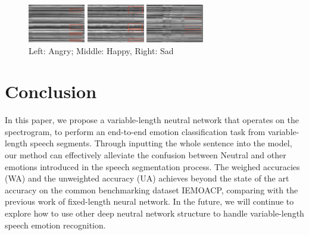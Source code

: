 \documentclass[a4paper]{article}
\begin{document}
\begin{figure}[htb]
    \begin{minipage}[b]{0.25\linewidth}
      \centering
      \centerline{\includegraphics[width=2.5cm]{rnn_out_var_ang}}
    \end{minipage}
    \hfill
    \begin{minipage}[b]{0.25\linewidth}
      \centering
      \centerline{\includegraphics[width=2.5cm]{rnn_out_var_hap}}
    \end{minipage}
    \hfill
    \begin{minipage}[b]{0.25\linewidth}
      \centering
      \centerline{\includegraphics[width=2.5cm]{rnn_out_var_sad}}
    \end{minipage}
    \caption{Left: Angry; Middle: Happy, Right: Sad}
    \label{fig:rnn_emo}
\end{figure}


    
\section{Conclusion}
\label{sec:conclusion}

In this paper, we propose a variable-length neutral network that operates on the spectrogram, to perform an end-to-end emotion classification task from variable-length speech segments. Through inputting the whole sentence into the model, our method can effectively alleviate the confusion between Neutral and other emotions introduced in the speech segmentation process. The weighed accuracies (WA) and the unweighted accuracy (UA) achieves beyond the state of the art accuracy on the common benchmarking dataset IEMOACP, comparing with the previous work of fixed-length neural network. In the future, we will continue to explore how to use other deep neutral network structure to handle variable-length speech emotion recognition.
\end{document}

